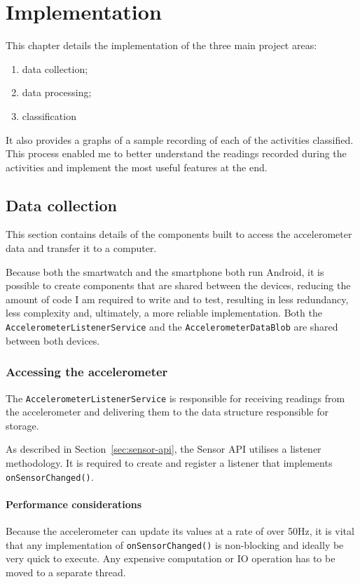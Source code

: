 \chapter{Implementation}
  This chapter details the implementation of the three main project areas:
  \begin{enumerate}
    \item data collection;
    \item data processing;
    \item classification
  \end{enumerate}
  
  It also provides a graphs of a sample recording of each of the activities classified. This process enabled me to better understand the readings recorded during the activities and implement the most useful features at the end.
  
  \section{Data collection}
    This section contains details of the components built to access the accelerometer data and transfer it to a computer.
    
    Because both the smartwatch and the smartphone both run Android, it is possible to create components that are shared between the devices, reducing the amount of code I am required to write and to test, resulting in less redundancy, less complexity and, ultimately, a more reliable implementation. Both the \texttt{AccelerometerListenerService} and the \texttt{AccelerometerDataBlob} are shared between both devices.
    
    \subsection{Accessing the accelerometer}
      The \texttt{AccelerometerListenerService} is responsible for receiving readings from the accelerometer and delivering them to the data structure responsible for storage.
      
      As described in Section~\ref{sec:sensor-api}, the Sensor API utilises a listener methodology. It is required to create and register a listener that implements \texttt{onSensorChanged()}. 
      
      \subsubsection{Performance considerations}
        Because the accelerometer can update its values at a rate of over 50\si{Hz}, it is vital that any implementation of \texttt{onSensorChanged()} is non-blocking and ideally be very quick to execute. Any expensive computation or IO operation has to be moved to a separate thread.
        
